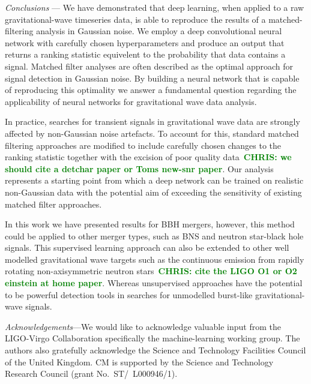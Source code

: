 \documentclass[%
 amsmath,amssymb,
 aps,
 twocolumn,
 prl,
 reprint,
floatfix,
]{revtex4-1}
\newcommand{\chris}[1]{\textbf{\textcolor{green}{CHRIS: #1}}}
\begin{document}
%
%
\textit{Conclusions} --- 
%
%
We have demonstrated that deep learning, when applied to a raw
gravitational-wave timeseries data, is able to reproduce the results of a
matched-filtering analysis in Gaussian noise. We employ a deep convolutional
neural network with carefully chosen hyperparameters and produce an output that
returns a ranking statistic equivelent to the probability that data contains a
signal. Matched filter analyses are often described as the optimal approach for
signal detection in Gaussian noise. By building a neural network that is
capable of reproducing this optimality we answer a fundamental question
regarding the applicability of neural networks for gravitational wave data
analysis. 

%
%
In practice, searches for transient signals in gravitational wave data are
strongly affected by non-Gaussian noise artefacts. To account for this,
standard matched filtering approaches are modified to include carefully chosen
changes to the ranking statistic together with the excision of poor quality
data~\chris{we should cite a detchar paper or Toms new-snr paper}. Our analysis
represents a starting point from which a deep network can be trained on
realistic non-Gaussian data with the potential aim of exceeding the sensitivity
of existing matched filter approaches.

%
%
In this work we have presented results for \ac{BBH} mergers, however, this
method could be applied to other merger types, such as \ac{BNS} and neutron
star-black hole signals. This supervised learning approach can also be extended
to other well modelled gravitational wave targets such as the continuous
emission from rapidly rotating non-axisymmetric neutron stars~\chris{cite the
LIGO O1 or O2 einstein at home paper}. Whereas unsupervised approaches have the
potential to be powerful detection tools in searches for unmodelled burst-like
gravitational-wave signals. 

%
%
\emph{Acknowledgements}---We would like to acknowledge valuable input from the
LIGO-Virgo Collaboration specifically the machine-learning working group. The
authors also gratefully acknowledge the Science and Technology Facilities
Council of the United Kingdom.  CM is supported by the Science and Technology
Research Council (grant No.~ST/~L000946/1).
%




\end{document}
